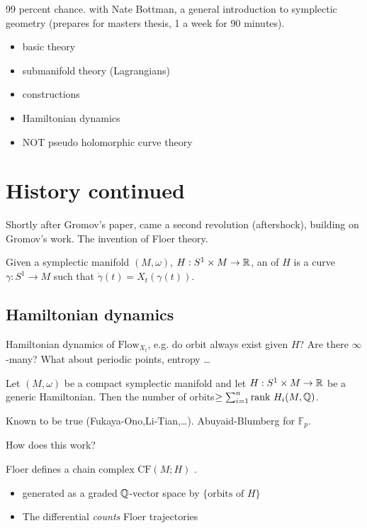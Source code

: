 99 percent chance. with Nate Bottman, a general introduction to symplectic geometry (prepares for masters thesis, 1 a week for 90 minutes).
\begin{itemize}
    \item basic theory
    \item submanifold theory (Lagrangians) 
    \item constructions 
    \item Hamiltonian dynamics
    \item NOT pseudo holomorphic curve theory
\end{itemize}

\section{History continued}

Shortly after Gromov's paper, came a second revolution (aftershock), building on Gromov's work. The invention 
of Floer theory.

\begin{definition*}
    Given a symplectic manifold \((M,\omega)\), \(H:S^1\times M\to\mathbb{R}\), an  of 
    \(H\) is a curve \(\gamma:S^1\to M\) such that \(\dot{\gamma}(t)=X_t(\gamma(t))\).
\end{definition*}

\subsection{Hamiltonian dynamics}

Hamiltonian dynamics of \(\text{Flow}_{X_t}\), e.g. do orbit always exist given \(H\)? Are there \(\infty\)-many?
What about periodic points, entropy \dots 

 Let \((M,\omega)\) be a compact symplectic manifold  and let 
\(H:S^1\times M\to \mathbb{R}\) be a generic Hamiltonian. Then the number of orbits\(\geq \sum_{i=1}^n\text{rank }H_i(M,\mathbb{Q})\).

Known to be true (Fukaya-Ono,Li-Tian,\dots). Abuyaid-Blumberg for \(\mathbb{F}_p\). 

How does this work?

Floer defines a chain complex \(\text{CF}(M;H)\) . 
\begin{itemize}
    \item generated as a graded \(\mathbb{Q}\)-vector space by \(\{\text{orbits of } H\}\)
    \item The differential \textit{counts} Floer trajectories
\end{itemize}

